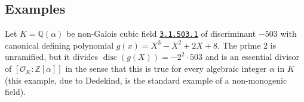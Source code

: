 \documentclass{article}
\def\Z{{\mathbb Z}}
\def\Q{{\mathbb Q}}
\def\OO{{\mathcal O}}
\def\p{{\mathfrak p}}
\def\Qpbar{\overline{\Q_p}}
\DeclareMathOperator{\disc}{disc}
\DeclareMathOperator{\ord}{ord}
\begin{document}
%
%
%

\subsection{Examples}
Let $K=\Q(\alpha)$ be non-Galois cubic field \href{www.lmfdb.org/NumberField/3.1.503.1}{\texttt{3.1.503.1}} of discriminant $-503$ with canonical defining polynomial $g(x)=X^3-X^2+2X+8$.
The prime $2$ is unramified, but it divides $\disc(g(X))=-2^2\cdot 503$ and is an essential divisor of $[\OO_K:\Z[\alpha]]$ in the sense that this is true for every algebraic integer $\alpha$ in $K$ (this example, due to Dedekind, is the standard example of a non-monogenic field).
\end{document}
